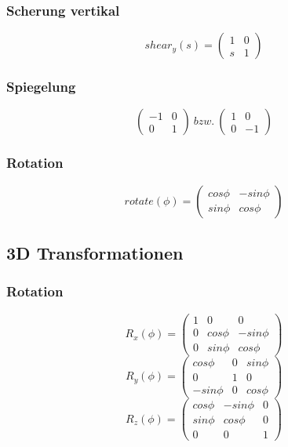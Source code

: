 \subsubsection{Scherung vertikal}
\[shear_y(s) = \begin{pmatrix} 1 & 0 \\ s & 1 \end{pmatrix}\]

\subsubsection{Spiegelung}
\[\begin{pmatrix} -1 & 0 \\ 0 & 1 \end{pmatrix}~bzw.~\begin{pmatrix} 1 & 0 \\ 0 & -1 \end{pmatrix}\]

\subsubsection{Rotation}
\[rotate(\phi) = \begin{pmatrix} cos\phi & -sin\phi \\ sin\phi & cos\phi \end{pmatrix}\]


\subsection{3D Transformationen}

\subsubsection{Rotation}
\[R_x(\phi) = \begin{pmatrix} 1 & 0 & 0 \\ 0 & cos\phi & -sin\phi \\ 0 & sin\phi & cos\phi \end{pmatrix}\]
\[R_y(\phi) = \begin{pmatrix} cos\phi & 0 & sin\phi \\ 0 & 1 & 0 \\ -sin\phi & 0 & cos\phi \end{pmatrix}\]
\[R_z(\phi) = \begin{pmatrix} cos\phi & -sin\phi & 0 \\ sin\phi & cos\phi & 0 \\ 0 & 0 & 1 \end{pmatrix}\]



